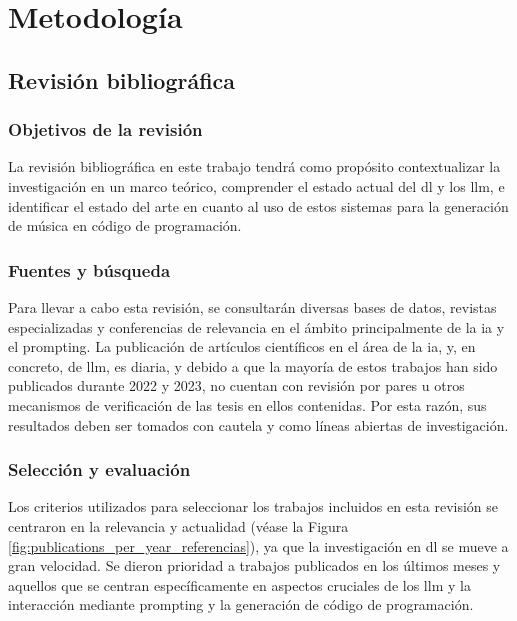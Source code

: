 \chapter{Metodología}



\section{Revisión bibliográfica}

\subsection{Objetivos de la revisión}
La revisión bibliográfica en este trabajo tendrá como propósito contextualizar la investigación en un marco teórico, comprender el estado actual del \gls{dl} y los \gls{llm}, e identificar el estado del arte en cuanto al uso de estos sistemas para la generación de música en código de programación.

\subsection{Fuentes y búsqueda}
Para llevar a cabo esta revisión, se consultarán diversas bases de datos, revistas especializadas y conferencias de relevancia en el ámbito principalmente de la \gls{ia} y el prompting. La publicación de artículos científicos en el área de la \gls{ia}, y, en concreto, de \gls{llm}, es diaria, y debido a que la mayoría de estos trabajos han sido publicados durante 2022 y 2023, no cuentan con revisión por pares u otros mecanismos de verificación de las tesis en ellos contenidas. Por esta razón, sus resultados deben ser tomados con cautela y como líneas abiertas de investigación.


\subsection{Selección y evaluación}
Los criterios utilizados para seleccionar los trabajos incluidos en esta revisión se centraron en la relevancia y actualidad (véase la Figura \ref{fig:publications_per_year_referencias}), ya que la investigación en \gls{dl} se mueve a gran velocidad. Se dieron prioridad a trabajos publicados en los últimos meses y aquellos que se centran específicamente en aspectos cruciales de los \gls{llm} y la interacción mediante prompting y la generación de código de programación.

